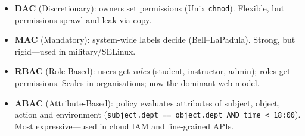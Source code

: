 \begin{itemize}
    \item \textbf{DAC} (Discretionary): owners set permissions (Unix \texttt{chmod}). Flexible, but permissions sprawl and leak via copy.
    \item \textbf{MAC} (Mandatory): system-wide labels decide (Bell--LaPadula). Strong, but rigid---used in military/SELinux.
    \item \textbf{RBAC} (Role-Based): users get \emph{roles} (student, instructor, admin); roles get permissions. Scales in organisations; now the dominant web model.
    \item \textbf{ABAC} (Attribute-Based): policy evaluates attributes of subject, object, action and environment (\texttt{subject.dept == object.dept AND time < 18:00}). Most expressive---used in cloud IAM and fine-grained APIs.
\end{itemize}

